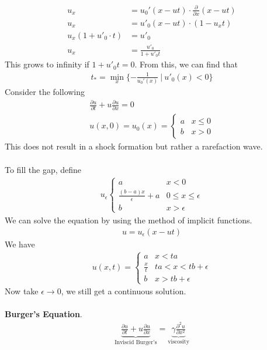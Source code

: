 \documentclass[12pt, letterpaper]{article}
\begin{document}
\begin{align*}
    u_x &= u_0'(x-ut) \cdot \frac{\partial}{\partial x}(x - ut) \\
    u_x &= u'_0(x-ut) \cdot (1 - u_xt) \\
    u_x(1+u'_0\cdot t) &= u'_0   \\
    u_x &= \frac{u'_0}{1+u'_0t}
\end{align*}
This grows to infinity if $1 + u'_0t = 0$. From this, we can find that 
\begin{align*}
    t_\ast = \min_x\{-\frac{1}{u_0'(x)}\ |\ u'_0 (x) < 0\}
\end{align*}
 Consider the following 
\begin{align*}
    \frac{\partial u}{\partial t} + u \frac{\partial u}{\partial x} = 0 \\
    u(x,0) = u_0(x) = \begin{cases}
        a & x \le 0 \\
        b & x > 0
    \end{cases}
\end{align*}
This does not result in a shock formation but rather a rarefaction wave. \\ \\
To fill the gap, define
\begin{align*}
    u_\epsilon \begin{cases}
        a & x < 0 \\
        \frac{(b-a)x}{\epsilon} + a & 0 \le x \le \epsilon \\
        b & x > \epsilon
    \end{cases}
\end{align*}
We can solve the equation by using the method of implicit functions.
\begin{align*}
    u = u_\epsilon(x-ut)
\end{align*}
We have
\begin{align*}
    u(x,t) = \begin{cases}
        a & x < ta \\
        \frac xt & ta < x < tb + \epsilon \\
        b & x > tb + \epsilon
    \end{cases}
\end{align*}
Now take $\epsilon \rightarrow 0$, we still get a continuous solution.  \\ \\
\textbf{Burger's Equation}.
\begin{align*}
    \underbrace{\frac{\partial u}{\partial t} + u \frac{\partial u}{\partial x}}_{\text{Inviscid Burger's}} = \underbrace{\gamma \frac{\partial^2u}{\partial x^2}}_{\text{viscosity}}
\end{align*}
\end{document}
